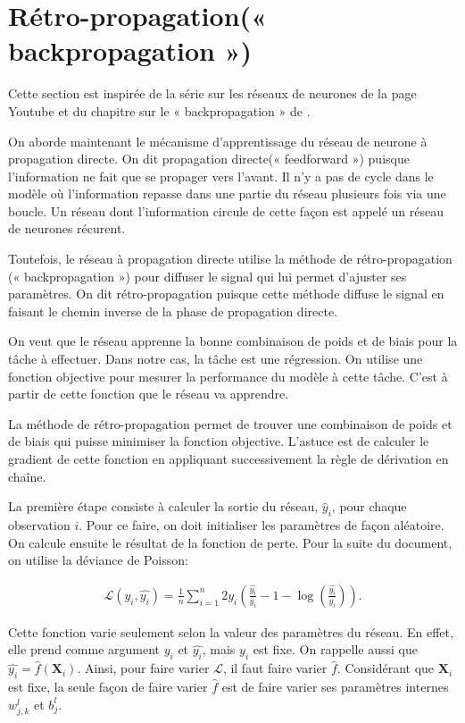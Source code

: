 \section{Rétro-propagation(« backpropagation ») }
\label{sec:RN:back}

Cette section est inspirée de la série sur les réseaux de neurones de la page Youtube \citet{3blue1brown} et du chapitre sur le « backpropagation » de \citet{nielsen2015neural}.

On aborde maintenant le mécanisme d'apprentissage du réseau de neurone à propagation directe. On dit propagation directe(« feedforward ») puisque l'information ne fait que se propager vers l'avant. Il n'y a pas de cycle dans le modèle où l'information repasse dans une partie du réseau plusieurs fois via une boucle. Un réseau dont l'information circule de cette façon est appelé un réseau de neurones récurent. 

Toutefois, le réseau à propagation directe utilise la méthode de rétro-propagation (« backpropagation ») pour diffuser le signal qui lui permet d'ajuster ses paramètres.  On dit rétro-propagation puisque cette méthode diffuse le signal en faisant le chemin inverse de la phase de propagation directe.

On veut que le réseau apprenne la bonne combinaison de poids et de biais pour la tâche à effectuer. Dans notre cas, la tâche est une régression. On utilise une fonction objective pour mesurer la performance du modèle à cette tâche. C'est à partir de cette fonction que le réseau va apprendre. 

La méthode de rétro-propagation permet de trouver une combinaison de poids et de biais qui puisse minimiser la fonction objective. L'astuce est de calculer le gradient de cette fonction en appliquant successivement la règle de dérivation en chaîne. 



La première étape consiste à calculer la sortie du réseau, $\hat{y}_i$, pour chaque observation $i$. Pour ce faire, on doit initialiser les paramètres de façon aléatoire. On calcule ensuite le résultat de la fonction de perte. Pour la suite du document, on utilise la déviance de Poisson:

\begin{align*}
\mathcal{L}(y_i,\hat{y_i}) = \frac{1}{n} \sum_{i=1}^n 2 y_i \left( \frac{\hat{y_i}}{y_i} -1 - \log\left(\frac{\hat{y_i}}{y_i}\right) \right).
\end{align*}

Cette fonction varie seulement selon la valeur des paramètres du réseau. En effet, elle prend comme argument $ y_i$ et $\hat{y_i}$, mais $y_i$ est fixe. On rappelle aussi que $\hat{y_i}=\hat{f}(\mathbf{X}_i)$. Ainsi, pour faire varier $\mathcal{L}$, il faut faire varier $\hat{f}$. Considérant que  $\mathbf{X}_i$ est fixe, la seule façon de faire varier 
$\hat{f}$ est de faire varier ses paramètres internes $w_{j,k}^l$ et $b_j^l$. 

